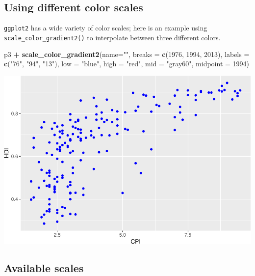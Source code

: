 \documentclass[
]{book}
\newenvironment{Shaded}{\begin{snugshade}}{\end{snugshade}}
\newcommand{\DataTypeTok}[1]{\textcolor[rgb]{0.13,0.29,0.53}{#1}}
\newcommand{\DecValTok}[1]{\textcolor[rgb]{0.00,0.00,0.81}{#1}}
\newcommand{\KeywordTok}[1]{\textcolor[rgb]{0.13,0.29,0.53}{\textbf{#1}}}
\newcommand{\NormalTok}[1]{#1}
\newcommand{\OperatorTok}[1]{\textcolor[rgb]{0.81,0.36,0.00}{\textbf{#1}}}
\newcommand{\StringTok}[1]{\textcolor[rgb]{0.31,0.60,0.02}{#1}}
\begin{document}
\hypertarget{using-different-color-scales}{%
\subsection{Using different color scales}\label{using-different-color-scales}}

\texttt{ggplot2} has a wide variety of color scales; here is an example using \texttt{scale\_color\_gradient2()} to interpolate between three different colors.

\begin{Shaded}
\begin{Highlighting}[]
\NormalTok{p3 }\OperatorTok{+}
\StringTok{  }\KeywordTok{scale\_color\_gradient2}\NormalTok{(}\DataTypeTok{name=}\StringTok{""}\NormalTok{,}
                        \DataTypeTok{breaks =} \KeywordTok{c}\NormalTok{(}\DecValTok{1976}\NormalTok{, }\DecValTok{1994}\NormalTok{, }\DecValTok{2013}\NormalTok{),}
                        \DataTypeTok{labels =} \KeywordTok{c}\NormalTok{(}\StringTok{"\textquotesingle{}76"}\NormalTok{, }\StringTok{"\textquotesingle{}94"}\NormalTok{, }\StringTok{"\textquotesingle{}13"}\NormalTok{),}
                        \DataTypeTok{low =} \StringTok{"blue"}\NormalTok{,}
                        \DataTypeTok{high =} \StringTok{"red"}\NormalTok{,}
                        \DataTypeTok{mid =} \StringTok{"gray60"}\NormalTok{,}
                        \DataTypeTok{midpoint =} \DecValTok{1994}\NormalTok{)}
\end{Highlighting}
\end{Shaded}

\includegraphics{R/Rgraphics/figures/unnamed-chunk-198-1.pdf}

\hypertarget{available-scales}{%
\subsection{Available scales}\label{available-scales}}
\end{document}
